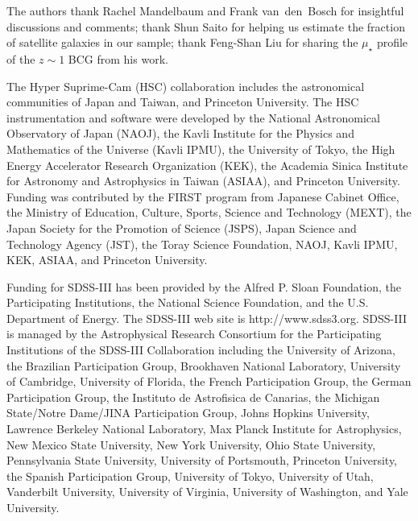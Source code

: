 \documentclass[a4paper,fleqn,usenatbib]{mnras}
\def\mden{{$\mu_{\star}$}}
\begin{document}
  The authors thank Rachel Mandelbaum and Frank van~den~Bosch for insightful 
  discussions and comments; 
  thank Shun Saito for helping us estimate the fraction of satellite 
  galaxies in our sample;
  thank Feng-Shan Liu for sharing the \mden{} profile of the $z\sim1$ BCG from 
  his work.

  The Hyper Suprime-Cam (HSC) collaboration includes the astronomical communities of 
  Japan and Taiwan, and Princeton University.  The HSC instrumentation and software were
  developed by the National Astronomical Observatory of Japan (NAOJ), the Kavli Institute
  for the Physics and Mathematics of the Universe (Kavli IPMU), the University of Tokyo,
  the High Energy Accelerator Research Organization (KEK), the Academia Sinica Institute
  for Astronomy and Astrophysics in Taiwan (ASIAA), and Princeton University.  
  Funding was contributed by the FIRST program from Japanese Cabinet Office, the Ministry 
  of Education, Culture, Sports, Science and Technology (MEXT), the Japan Society for 
  the Promotion of Science (JSPS), Japan Science and Technology Agency (JST), the
  Toray Science Foundation, NAOJ, Kavli IPMU, KEK, ASIAA, and Princeton University.
   
  Funding for SDSS-III has been provided by the Alfred P. Sloan Foundation, the
  Participating Institutions, the National Science Foundation, and the U.S.  Department of
  Energy. The SDSS-III web site is http://www.sdss3.org.  SDSS-III is managed by the
  Astrophysical Research Consortium for the Participating Institutions of the SDSS-III
  Collaboration including the University of Arizona, the Brazilian Participation Group,
  Brookhaven National Laboratory, University of Cambridge, University of Florida, the
  French Participation Group, the German Participation Group, the Instituto de Astrofisica
  de Canarias, the Michigan State/Notre Dame/JINA Participation Group, Johns Hopkins
  University, Lawrence Berkeley National Laboratory, Max Planck Institute for
  Astrophysics, New Mexico State University, New York University, Ohio State University,
  Pennsylvania State University, University of Portsmouth, Princeton University, the
  Spanish Participation Group, University of Tokyo, University of Utah, Vanderbilt
  University, University of Virginia, University of Washington, and Yale University.
  
\end{document}
